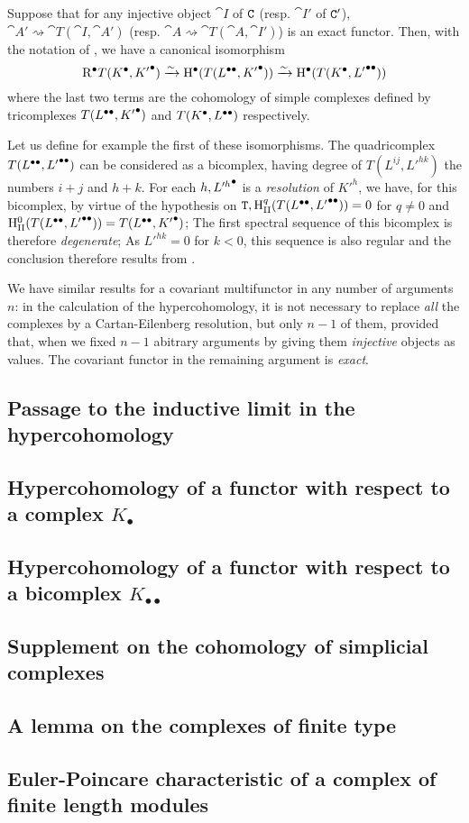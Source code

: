 \begin{proposition}[11.4.7]
\label{0.11.4.7}
Suppose that for any injective object $\cat{I}$ of $\mathtt{C}$ (resp. $\cat{I'}$ of $\mathtt{C}'$), $\cat{A'}\rightsquigarrow \cat{T}(\cat{I}, \cat{A'})$ (resp. $\cat{A}\rightsquigarrow \cat{T}(\cat{A}, \cat{I'})$)
is an exact functor. Then, with the notation of , we have a canonical isomorphism
\[
  {\mathrm{R}}^{\bullet}T({K}^{\bullet}, {K'}^{\bullet}) \xrightarrow{\sim} {\mathrm{H}}^{\bullet}(T({L}^{\bullet\bullet}, {K'}^{\bullet})) \xrightarrow{\sim} {\mathrm{H}}^{\bullet}(T({K}^{\bullet}, {L'}^{\bullet\bullet})) 
\]
where the last two terms are the cohomology of simple complexes defined by tricomplexes $T({L}^{\bullet\bullet}, {K'}^{\bullet})$ and $T({K}^{\bullet}, {L}^{\bullet\bullet})$ respectively.
\end{proposition}

Let us define for example the first of these isomorphisms. The quadricomplex $T({L}^{\bullet\bullet}, {L'}^{\bullet\bullet})$ can be considered as a bicomplex, having degree of $T(L^{ij}, L'^{hk})$ the numbers $i+j$ and $h+k$.
For each $h, {L'^h}^{\bullet}$ is a \emph{resolution} of $K'^h$, we have, for this bicomplex, by virtue of the hypothesis on $\mathtt{T}, \mathrm{H}_\mathrm{II}^q(T({L}^{\bullet\bullet}, {L'}^{\bullet\bullet}))=0$ for $q\neq 0$ and $\mathrm{H}_\mathrm{II}^0(T({L}^{\bullet\bullet}, {L'}^{\bullet\bullet})) = T({L}^{\bullet\bullet}, {K'}^{\bullet})$; 
The first spectral sequence of this bicomplex is therefore \emph{degenerate}; As $L'^{hk}=0$ for $k<0$, this sequence is also regular  and the conclusion therefore results from .

We have similar results for a covariant multifunctor in any number of arguments $n$: in the calculation of the hypercohomology, it is not necessary to replace \emph{all} the complexes 
by a Cartan-Eilenberg resolution, but only $n-1$ of them, provided that, when we fixed $n-1$ abitrary arguments by giving them \emph{injective} objects as values.
The covariant functor in the remaining argument is \emph{exact}.


\subsection{Passage to the inductive limit in the hypercohomology}
\label{subsection:0.11.5}

\subsection{Hypercohomology of a functor with respect to a complex $K_{\bullet}$}
\label{subsection:0.11.6}

\subsection{Hypercohomology of a functor with respect to a bicomplex $K_{\bullet\bullet}$}
\label{subsection:0.11.7}

\subsection{Supplement on the cohomology of simplicial complexes}
\label{subsection:0.11.8}

\subsection{A lemma on the complexes of finite type}
\label{subsection:0.11.9}

\subsection{Euler-Poincare characteristic of a complex of finite length modules}
\label{subsection:0.11.10}